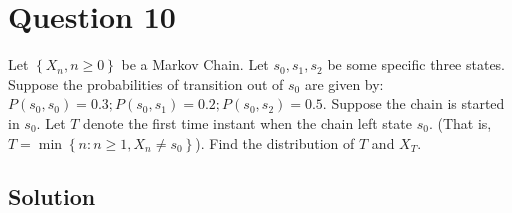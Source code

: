 \section*{Question 10}

Let \( \left \{ X_{n}, n \geq 0\right \} \) be a Markov Chain.
Let \( s_{0}, s_{1}, s_{2} \) be some specific three states.
Suppose the probabilities of transition out of \( s_{0} \) are given by: \( P\left(s_{0}, s_{0}\right)=0.3 ; P\left(s_{0}, s_{1}\right)=0.2 ; P\left(s_{0}, s_{2}\right)=0.5 \).
Suppose the chain is started in \( s_{0} \).
Let \( T \) denote the first time instant when the chain left state \( s_{0} \).
(That is, \( T=\min \left \{ n: n \geq 1, X_{n} \neq s_{0}\right \} \)).
Find the distribution of \( T \) and \( X_{T} \).

\subsection*{Solution}
